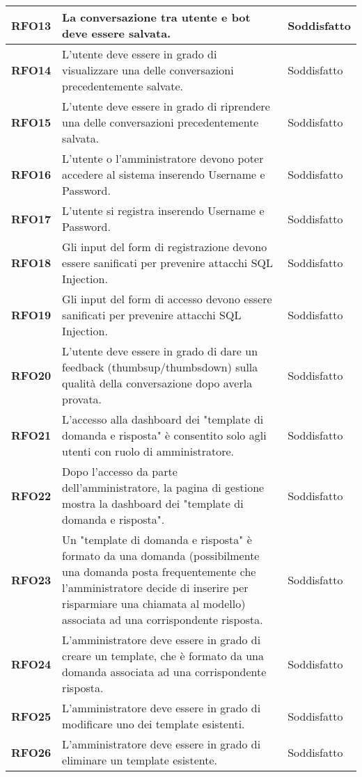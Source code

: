 \begin{longtable}{|>{\centering\arraybackslash}m{}|>{\centering\arraybackslash}m{}|>{\centering\arraybackslash}m{}|}
    \hline
    \textbf{RFO13} & La conversazione tra utente e bot deve essere salvata. & Soddisfatto \\
    \hline
    \textbf{RFO14} & L'utente deve essere in grado di visualizzare una delle conversazioni precedentemente salvate. & Soddisfatto \\
    \hline
    \textbf{RFO15} & L'utente deve essere in grado di riprendere una delle conversazioni precedentemente salvata. & Soddisfatto \\
    \hline
    \textbf{RFO16} & L'utente o l'amministratore devono poter accedere al sistema inserendo Username e Password. & Soddisfatto \\
    \hline
    \textbf{RFO17} & L'utente si registra inserendo Username e Password. & Soddisfatto \\
    \hline
    \textbf{RFO18} & Gli input del form di registrazione devono essere sanificati per prevenire attacchi SQL Injection. & Soddisfatto \\
    \hline
    \textbf{RFO19} & Gli input del form di accesso devono essere sanificati per prevenire attacchi SQL Injection. & Soddisfatto \\
    \hline
    \textbf{RFO20} & L'utente deve essere in grado di dare un feedback (thumbsup/thumbsdown) sulla qualità della conversazione dopo averla provata. & Soddisfatto \\
    \hline
    \textbf{RFO21} & L’accesso alla dashboard dei "template di domanda e risposta" è consentito solo agli utenti con ruolo di amministratore. & Soddisfatto \\
    \hline
    \textbf{RFO22} & Dopo l’accesso da parte dell'amministratore, la pagina di gestione mostra la dashboard dei "template di domanda e risposta". & Soddisfatto \\
    \hline
    \textbf{RFO23} & Un "template di domanda e risposta" è formato da una domanda (possibilmente una domanda posta frequentemente che l'amministratore decide di inserire per risparmiare una chiamata al modello) associata ad una corrispondente risposta. & Soddisfatto \\
    \hline
    \textbf{RFO24} & L'amministratore deve essere in grado di creare un template, che è formato da una domanda associata ad una corrispondente risposta. & Soddisfatto \\
    \hline
    \textbf{RFO25} & L'amministratore deve essere in grado di modificare uno dei template esistenti. & Soddisfatto \\
    \hline
    \textbf{RFO26} & L'amministratore deve essere in grado di eliminare un template esistente. & Soddisfatto \\

\end{longtable}
